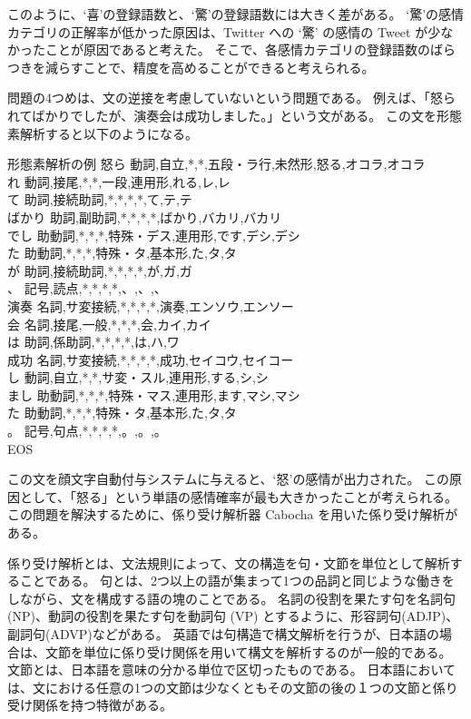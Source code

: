 \documentclass[11pt,a4j]{jsarticle}
\begin{document}
このように、`喜'の登録語数と、`驚'の登録語数には大きく差がある。
`驚'の感情カテゴリの正解率が低かった原因は、Twitter への `驚' の感情の Tweet が少なかったことが原因であると考えた。
そこで、各感情カテゴリの登録語数のばらつきを減らすことで、精度を高めることができると考えられる。

問題の4つめは、文の逆接を考慮していないという問題である。
例えば、「怒られてばかりでしたが、演奏会は成功しました。」という文がある。
この文を形態素解析すると以下のようになる。

\begin{itembox}[l]{形態素解析の例}
  怒ら  動詞,自立,*,*,五段・ラ行,未然形,怒る,オコラ,オコラ\\
  れ  動詞,接尾,*,*,一段,連用形,れる,レ,レ\\
  て  助詞,接続助詞,*,*,*,*,て,テ,テ\\
  ばかり  助詞,副助詞,*,*,*,*,ばかり,バカリ,バカリ\\
  でし  助動詞,*,*,*,特殊・デス,連用形,です,デシ,デシ\\
  た  助動詞,*,*,*,特殊・タ,基本形,た,タ,タ\\
  が  助詞,接続助詞,*,*,*,*,が,ガ,ガ\\
  、  記号,読点,*,*,*,*,、,、,、\\
  演奏  名詞,サ変接続,*,*,*,*,演奏,エンソウ,エンソー\\
  会  名詞,接尾,一般,*,*,*,会,カイ,カイ\\
  は  助詞,係助詞,*,*,*,*,は,ハ,ワ\\
  成功  名詞,サ変接続,*,*,*,*,成功,セイコウ,セイコー\\
  し  動詞,自立,*,*,サ変・スル,連用形,する,シ,シ\\
  まし  助動詞,*,*,*,特殊・マス,連用形,ます,マシ,マシ\\
  た  助動詞,*,*,*,特殊・タ,基本形,た,タ,タ\\
  。  記号,句点,*,*,*,*,。,。,。\\
  EOS
\end{itembox}

この文を顔文字自動付与システムに与えると、`怒'の感情が出力された。
この原因として、「怒る」という単語の感情確率が最も大きかったことが考えられる。
この問題を解決するために、係り受け解析器 Cabocha を用いた係り受け解析がある。

係り受け解析とは、文法規則によって、文の構造を句・文節を単位として解析することである。
句とは、2つ以上の語が集まって1つの品詞と同じような働きをしながら、文を構成する語の塊のことである。
名詞の役割を果たす句を名詞句 (NP)、動詞の役割を果たす句を動詞句 (VP) とするように、形容詞句(ADJP)、副詞句(ADVP)などがある。
英語では句構造で構文解析を行うが、日本語の場合は、文節を単位に係り受け関係を用いて構文を解析するのが一般的である。
文節とは、日本語を意味の分かる単位で区切ったものである。
日本語においては、文における任意の1つの文節は少なくともその文節の後の１つの文節と係り受け関係を持つ特徴がある。
\end{document}
